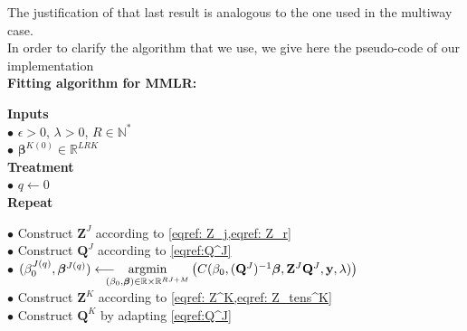 \documentclass[preprint,12pt]{elsarticle}
\begin{document}
\noindent The justification of that last result is analogous to the one used in the multiway case.\\[10 pt]
In order to clarify the algorithm that we use, we give here the pseudo-code of our implementation\\[5 pt]

{\fontsize{12}{8}\selectfont \noindent \textbf{Fitting algorithm for MMLR:}}\\[1 pt]
\begin{mdframed}[leftmargin=0cm, rightmargin=0.2cm]
    \noindent \textbf{Inputs}\\
    \phantom{a}\hspace{5 pt} $\bullet$ $\epsilon >0$, $\lambda >0$, $R \in \mathbb{N}^{*}$\\[2 pt]
    \phantom{a}\hspace{5 pt} $\bullet$ $\bm{\beta}^{K(0)} \in \mathbb{R}^{LRK}$\\[4 pt]
    \textbf{Treatment}\\
    \phantom{a}\hspace{5 pt} $\bullet$ $q \leftarrow 0$\\[2 pt]
    \phantom{a}\hspace{5 pt}  \textbf{Repeat}\\[2 pt]
    \phantom{a}\hspace{22 pt} $\bullet$ Construct $\mathbf{Z}^J$ according to \cref{eqref: Z_j,eqref: Z_r}\\[2 pt]
    \phantom{a}\hspace{25 pt} $\bullet$ Construct $\mathbf{Q}^J$ according to \cref{eqref:Q^J}\\[2 pt]
    \phantom{a}\hspace{25 pt}  $\bullet$ $(\beta_0^{J {(q)}}, \bm{\beta}^{J {(q)}}) \longleftarrow \hspace{-10 pt} \underset{(\beta_0, \bm{\beta}) \in \mathbb{R} \times \mathbb{R}^{RJ + M}}{\text{argmin}} \left( C(\beta_0, (\mathbf{Q}^J)^{-1}\bm{\beta},\mathbf{Z}^J \mathbf{Q}^J, \mathbf{y}, \lambda) \right)$\\[2 pt]
    \phantom{a}\hspace{25 pt} $\bullet$ Construct $\mathbf{Z}^K$ according to \cref{eqref: Z^K,eqref: Z_tens^K}\\[3 pt]
    \phantom{a}\hspace{25 pt} $\bullet$ Construct $\mathbf{Q}^K$ by adapting \cref{eqref:Q^J}\\[2 pt]

\end{mdframed}
\end{document}
